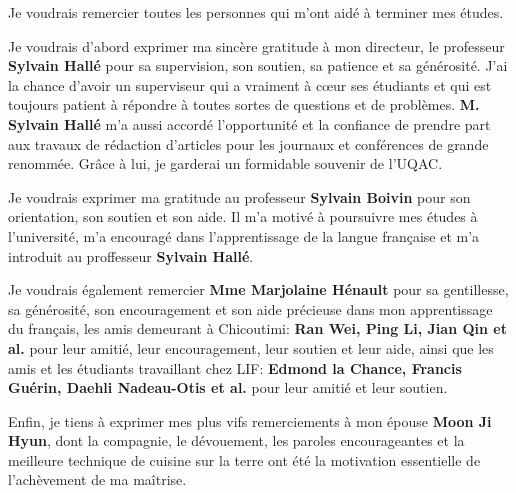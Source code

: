 
\begin{acknowledgements}

Je voudrais remercier toutes les personnes qui m'ont aidé à terminer mes études.

Je voudrais d'abord exprimer ma sincère gratitude à mon directeur, le professeur \textbf{Sylvain Hallé} pour sa supervision, son soutien, sa patience et sa générosité. J'ai la chance d'avoir un superviseur qui a vraiment à c\oe{}ur ses étudiants et qui est toujours patient à répondre à toutes sortes de questions et de problèmes. \textbf{M. Sylvain Hallé} m'a aussi accordé l'opportunité et la confiance de prendre part aux travaux de rédaction d'articles pour les journaux et conférences de grande renommée. Grâce à lui, je garderai un formidable souvenir de l'UQAC.

Je voudrais exprimer ma gratitude au professeur \textbf{Sylvain Boivin} pour son orientation, son soutien et son aide. Il m'a motivé à poursuivre mes études à l'université, m'a encouragé dans l'apprentissage de la langue française et m'a introduit au proffesseur \textbf{Sylvain Hallé}.

Je voudrais également remercier \textbf{Mme Marjolaine Hénault} pour sa gentillesse, sa générosité, son encouragement et son aide précieuse dans mon apprentissage du français, les amis demeurant à Chicoutimi: \textbf{Ran Wei, Ping Li, Jian Qin et al.} pour leur amitié, leur encouragement, leur soutien et leur aide, ainsi que les amis et les étudiants travaillant chez LIF: \textbf{Edmond la Chance, Francis Guérin, Daehli Nadeau-Otis et al.} pour leur amitié et leur soutien.

Enfin, je tiens à exprimer mes plus vifs remerciements à mon épouse \textbf {Moon Ji Hyun}, dont la compagnie, le dévouement, les paroles encourageantes et la meilleure technique de cuisine sur la terre ont été la motivation essentielle de l'achèvement de ma maîtrise.

\end{acknowledgements}